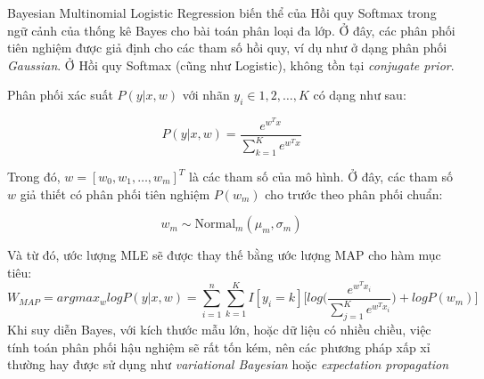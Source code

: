 Bayesian Multinomial Logistic Regression biến thể của Hồi quy Softmax trong ngữ cảnh của thống kê Bayes cho bài toán phân loại đa lớp. Ở đây, các phân phối tiên nghiệm được giả định cho các tham số hồi quy, ví dụ như ở dạng phân phối \emph{Gaussian}. Ở Hồi quy Softmax (cũng như Logistic), không tồn tại \emph{conjugate prior}. 

Phân phối xác suất $P(y|x,w)$ với nhãn $y_i \in {1, 2, \dots, K}$ có dạng như sau:

\begin{equation*}
    P(y|x,w) = \frac{e^{w^Tx}}{\sum^K_{k=1}e^{w^Tx}}
\end{equation*}

Trong đó, $w = [w_0, w_1,\dots,w_m]^T$ là các tham số của mô hình. Ở đây, các tham số $w$ giả thiết có phân phối tiên nghiệm $P(w_m)$ cho trước theo phân phối chuẩn:

\begin{equation*}
    w_m \sim \text{Normal}_m(\mu_m,\sigma_m)
\end{equation*}

Và từ đó, ước lượng MLE sẽ được thay thế bằng ước lượng MAP cho hàm mục tiêu:
\begin{equation*}
    W_{MAP} = argmax_{w}logP(y|x,w) = {\sum^n_{i=1}\sum^K_{k=1}I[y_i=k]\Bigg[log\Big(\frac{e^{w^Tx_i}}{\sum^K_{j=1}e^{w^Tx_i}}\Big) + logP(w_m)\Bigg]}
\end{equation*}
Khi suy diễn Bayes, với kích thước mẫu lớn, hoặc dữ liệu có nhiều chiều, việc tính toán phân phối hậu nghiệm sẽ rất tốn kém, nên các phương pháp xấp xỉ thường hay được sử dụng như \emph{variational Bayesian} hoặc \emph{expectation propagation}




